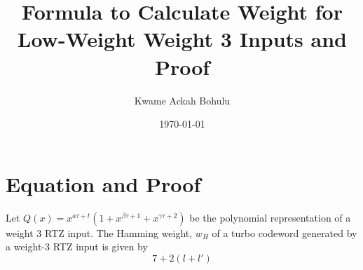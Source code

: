 \documentclass[11pt, oneside, dvipdfmx]{book}
\title{Formula to Calculate Weight for Low-Weight Weight 3 Inputs and Proof}
\author{Kwame Ackah Bohulu}
\date{\today}
\begin{document}
\maketitle

\newpage


\section{Equation and Proof}
\begin{theorem}
Let $Q(x) =x^{a\tau+t}(1+x^{\beta \tau +1}+x^{\gamma \tau +2})$ be the polynomial representation of a weight $3$ RTZ input.
The Hamming weight, $w_H$ of a turbo codeword generated by a weight-$3$ RTZ input is given by 
\begin{equation}
7+2(l+l')
\end{equation}
\end{theorem}
\end{document}

